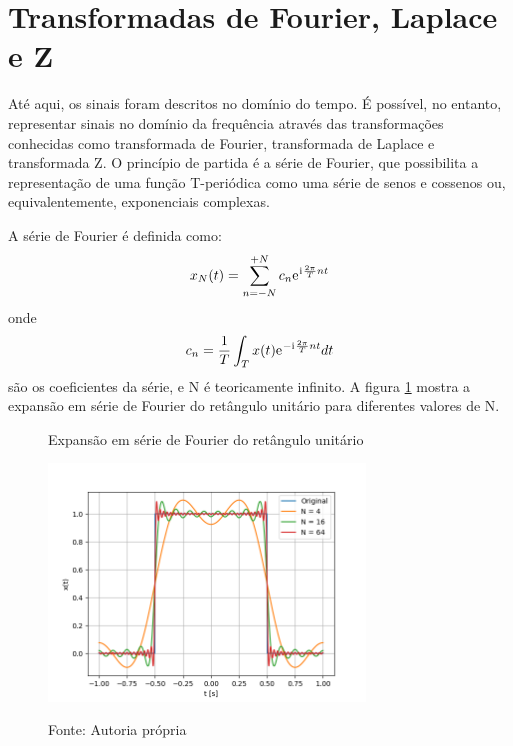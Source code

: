 \documentclass[12pt,a4paper]{report}
\newcommand{\I}{{\mathrm{i}\mkern1mu}}
\newcommand{\euler}{{\mathrm{e}\mkern1mu}}
\begin{document}
\section{Transformadas de Fourier, Laplace e Z}
  Até aqui, os sinais foram descritos no domínio do tempo. É possível, no entanto, representar sinais no
  domínio da frequência através das transformações conhecidas como transformada de Fourier, transformada de
  Laplace e transformada Z. O princípio de partida é a série de Fourier, que possibilita a representação de uma
  função T-periódica como uma série de senos e cossenos ou, equivalentemente, exponenciais complexas.

  A série de Fourier é definida como:
  \begin{equation}
    x_N(t) = \sum_{n = -N}^{+N} c_n \euler^{\I \frac{2 \pi}{T} n t}
  \end{equation}
  onde
  \begin{equation}
    c_n = \frac{1}{T} \int_T x(t) \euler^{-\I \frac{2 \pi}{T} n t} dt
  \end{equation}
  são os coeficientes da série, e N é teoricamente infinito. A figura \ref{fig:fourier} mostra a expansão
  em série de Fourier do retângulo unitário para diferentes valores de N.
  \begin{figure}[H]
    \caption{Expansão em série de Fourier do retângulo unitário}
    \centering
    \includegraphics[width=0.75\textwidth]{fourier_series}
    \label{fig:fourier}
    \caption*{Fonte: Autoria própria}
  \end{figure}
\end{document}
